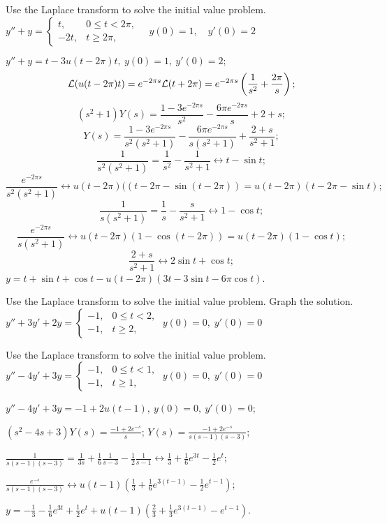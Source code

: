 \documentclass{ximera}
\begin{document}
\begin{problem}\label{exer:8.5.12} Use the Laplace transform to solve the initial value problem.
$y''+y=\left\{\begin{array}{cl} t,&0\le
t<2\pi,\\-2t,&t\ge 2\pi,\end{array}\right.\quad y(0)=1,\quad y'(0)=2$

\begin{solution}
$y''+y=t-3u(t-2\pi)t,\ y(0)=1,\ y'(0)=2;$
$$
{\cal L}(u(t-2\pi)t)=e^{-2\pi s}{\cal L}(t+2\pi)=e^{-2\pi s}
\left(\frac{1}{s^2}+\frac{2\pi}{s}\right);
$$
$$
(s^2+1)Y(s)=\frac{1-3e^{-2\pi s}}{s^2}-\frac{6\pi e^{-2\pi s}}{s}+2+s;
$$
$$
Y(s)=\frac{1-3e^{-2\pi s}}{s^2(s^2+1)}-\frac{6\pi e^{-2\pi s}}{s(s^2+1)}
+\frac{2+s}{s^2+1};
$$
$$
\frac{1}{s^2(s^2+1)}=\frac{1}{s^2}-\frac{1}{s^2+1}\leftrightarrow
t-\sin t;
$$
$$
\frac{e^{-2\pi s}}{s^2(s^2+1)}\leftrightarrow
u(t-2\pi)((t-2\pi-\sin(t-2\pi))=u(t-2\pi)(t-2\pi-\sin t);
$$
$$
\frac{1}{s(s^2+1)}=\frac{1}{s}-\frac{s}{s^2+1}\leftrightarrow
1-\cos t;
$$
$$
\frac{e^{-2\pi s}}{s(s^2+1)}\leftrightarrow u(t-2\pi)
(1-\cos(t-2\pi))=u(t-2\pi)(1-\cos t);
$$
$$
\frac{2+s}{s^2+1}\leftrightarrow 2\sin t+\cos t;
$$
$y=t+\sin t+\cos t-u(t-2\pi)(3t-3\sin t-6\pi\cos t)$.
\end{solution}
\end{problem}

\begin{problem}\label{exer:8.5.13} Use the Laplace transform to solve the initial value problem.  Graph the solution.
$y''+3y'+2y=\left\{\begin{array}{cl}-1,&0\le
t<2,\\-1,&t\ge 2,\end{array}\right.\;  y(0)=0,\;  y'(0)=0$
\end{problem}

\begin{problem}\label{exer:8.5.14} Use the Laplace transform to solve the initial value problem.
$y''-4y'+3y=\left\{\begin{array}{cl}-1,&0\le
t<1,\\-1,&t\ge 1,\end{array}\right.\;  y(0)=0,\;  y'(0)=0$

\begin{solution}
$y''-4y'+3y=-1+2u(t-1),\ y(0)=0,\ y'(0)=0$;

$(s^2-4s+3)Y(s)=\frac{-1+2e^{-s}}{s}$;
$Y(s)=\frac{-1+2e^{-s}}{s(s-1)(s-3)}$;

$\frac{1}{s(s-1)(s-3)}=\frac{1}{3s}+\frac{1}{6}\frac{1}{s-3}-\frac{1}{2}\frac{1}{s-1}
\leftrightarrow \frac{1}{3}+\frac{1}{6}e^{3t}-\frac{1}{2}e^t$;

$\frac{e^{-s}}{s(s-1)(s-3)}
\leftrightarrow u(t-1)\left(
\frac{1}{3}+\frac{1}{6}e^{3(t-1)}-\frac{1}{2}e^{t-1}\right)$;

$y=-\frac{1}{3}-\frac{1}{6}e^{3t}
+\frac{1}{2}e^t+u(t-1)\left(\frac{2}{3}+\frac{1}{3}e^{3(t-1)}
-e^{t-1}\right)$.
\end{solution}
\end{problem}
\end{document}
